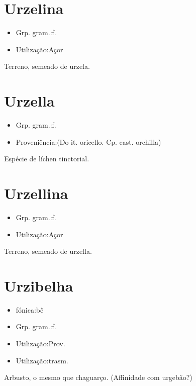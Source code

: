 \documentclass{article}
\begin{document}
\section{Urzelina}
\begin{itemize}
\item {Grp. gram.:f.}
\end{itemize}
\begin{itemize}
\item {Utilização:Açor}
\end{itemize}
Terreno, semeado de urzela.
\section{Urzella}
\begin{itemize}
\item {Grp. gram.:f.}
\end{itemize}
\begin{itemize}
\item {Proveniência:(Do it. \textunderscore oricello\textunderscore . Cp. cast. \textunderscore orchilla\textunderscore )}
\end{itemize}
Espécie de líchen tinctorial.
\section{Urzellina}
\begin{itemize}
\item {Grp. gram.:f.}
\end{itemize}
\begin{itemize}
\item {Utilização:Açor}
\end{itemize}
Terreno, semeado de urzella.
\section{Urzibelha}
\begin{itemize}
\item {fónica:bê}
\end{itemize}
\begin{itemize}
\item {Grp. gram.:f.}
\end{itemize}
\begin{itemize}
\item {Utilização:Prov.}
\end{itemize}
\begin{itemize}
\item {Utilização:trasm.}
\end{itemize}
Arbusto, o mesmo que \textunderscore chaguarço\textunderscore .
(Affinidade com \textunderscore urgebão\textunderscore ?)
\end{document}
